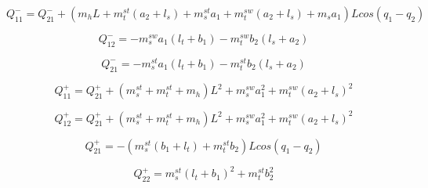 \[
Q_{11}^{-}=Q_{21}^{-}+(m_{h}L+m_{t}^{st}(a_{2}+l_{s})+m_{s}^{st}a_{1}+m_{t}^{sw}(a_{2}+l_{s})+m_{s}a_{1})Lcos(q_{1}-q_{2})\]


\[
Q_{12}^{-}=-m_{s}^{sw}a_{1}(l_{t}+b_{1})-m_{t}^{sw}b_{2}(l_{s}+a_{2})\]


\[
Q_{21}^{-}=-m_{s}^{st}a_{1}(l_{t}+b_{1})-m_{t}^{st}b_{2}(l_{s}+a_{2})\]



\[
Q_{11}^{+}=Q_{21}^{+}+(m_{s}^{st}+m_{t}^{st}+m_{h})L^{2}+m_{s}^{sw}a_{1}^{2}+m_{t}^{sw}(a_{2}+l_{s})^{2}\]


\[
Q_{12}^{+}=Q_{21}^{+}+(m_{s}^{st}+m_{t}^{st}+m_{h})L^{2}+m_{s}^{sw}a_{1}^{2}+m_{t}^{sw}(a_{2}+l_{s})^{2}\]


\[
Q_{21}^{+}=-(m_{s}^{st}(b_{1}+l_{t})+m_{t}^{st}b_{2})Lcos(q_{1}-q_{2})\]


\[
Q_{22}^{+}=m_{s}^{st}(l_{t}+b_{1})^{2}+m_{t}^{st}b_{2}^{2}\]







